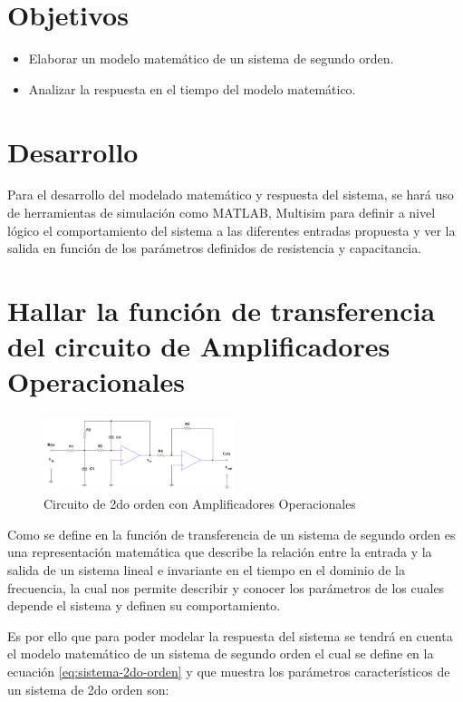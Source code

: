 \documentclass[conference]{IEEEtran}
\begin{document}
	\section{Objetivos}
	
	\begin{itemize}
		\item Elaborar un modelo matemático de un sistema de segundo orden.
		\item Analizar la respuesta en el tiempo del modelo matemático.
	\end{itemize}
	
	\section{Desarrollo}
	Para el desarrollo del modelado matemático y respuesta del sistema, se hará uso de herramientas de simulación como MATLAB, Multisim para definir a nivel lógico el comportamiento del sistema a las diferentes entradas propuesta y ver la salida en función de los parámetros definidos de resistencia y capacitancia.
	
	
	\section{Hallar la función de transferencia del circuito de Amplificadores Operacionales}
	
	\begin{figure}
		\centering
		\includegraphics[width=0.5\textwidth]{media/sistema-segundo_orden}
		\caption{Circuito de 2do orden con Amplificadores Operacionales}
		\label{fig:sistema-segundoorden}
	\end{figure}
	
	Como se define en \cite{ogata2015} la función de transferencia de un sistema de segundo orden es una representación matemática que describe la relación entre la entrada y la salida de un sistema lineal e invariante en el tiempo en el dominio de la frecuencia, la cual nos permite describir y conocer los parámetros de los cuales depende el sistema y definen su comportamiento.
	
	Es por ello que para poder modelar la respuesta del sistema se tendrá en cuenta el modelo matemático de un sistema de segundo orden el cual se define en la ecuación \ref{eq:sistema-2do-orden} y que muestra los parámetros característicos de un sistema de 2do orden son:
	
\end{document}
